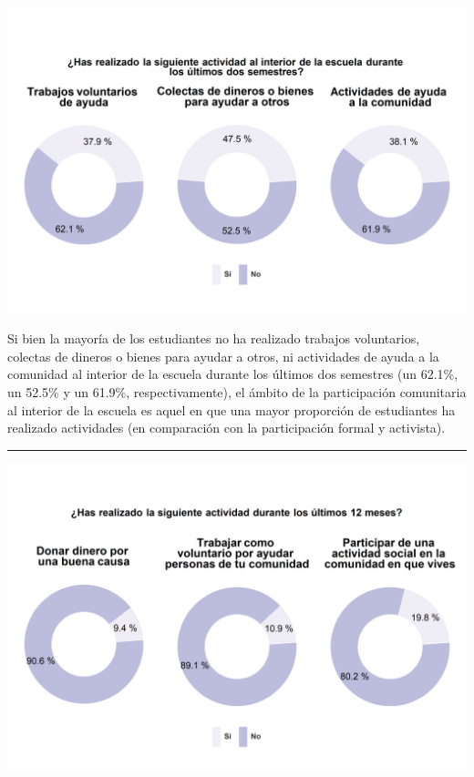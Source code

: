 \documentclass[
  14pt,
]{book}
\let\origfigure\figure
\let\endorigfigure\endfigure
\renewenvironment{figure}[1][2] {
  \expandafter\origfigure\expandafter[H]
} {
  \endorigfigure
}
\begin{document}
\begin{figure}[!ht]

{\centering \includegraphics[width=0.8\linewidth,]{images/graph_partcom_esc} 

}

\caption{Participación comunitaria al interior de la escuela}\label{fig:unnamed-chunk-56}
\end{figure}

Si bien la mayoría de los estudiantes no ha realizado trabajos voluntarios, colectas de dineros o bienes para ayudar a otros, ni actividades de ayuda a la comunidad al interior de la escuela durante los últimos dos semestres (un 62.1\%, un 52.5\% y un 61.9\%, respectivamente), el ámbito de la participación comunitaria al interior de la escuela es aquel en que una mayor proporción de estudiantes ha realizado actividades (en comparación con la participación formal y activista).

\begin{center}\rule{0.5\linewidth}{0.5pt}\end{center}

\begin{figure}[!ht]

{\centering \includegraphics[width=0.8\linewidth,]{images/graph_partcom} 

}

\caption{Participación comunitaria fuera de la escuela}\label{fig:unnamed-chunk-57}
\end{figure}
\end{document}
